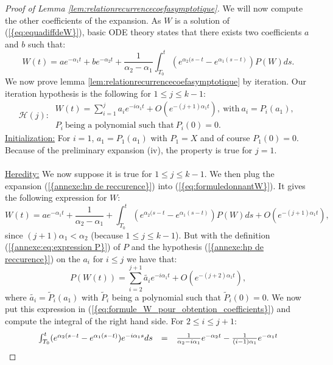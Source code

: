 \documentclass[11pt,a4paper,reqno]{amsart}
\theoremstyle{remark}
\numberwithin{equation}{section}
\begin{document}
\begin{appendix}
\begin{proof}[Proof of Lemma \ref{lem:relationrecurrencecoefasymptotique}]
We will now compute the other coefficients of the expansion. As $W$ is a solution of {{\rm (\ref{{eq:equadiffdeW}})}}, basic ODE theory states that there exists two coefficients $a$ and $b$ such that:
\begin{equation}\label{eq:formuledonnantW}
W(t)=ae^{-\alpha_1 t}+be^{-\alpha_2 t} +\frac{1}{\alpha_2-\alpha_1}\int_{T_0}^t(e^{\alpha_2(s-t}-e^{\alpha_1(s-t)})P(W)ds .
\end{equation}
We now prove lemma \ref{lem:relationrecurrencecoefasymptotique} by iteration. Our iteration hypothesis is the following for $1\leq j\leq k-1$:
\begin{equation} \label{annexe:hp de reccurence}
\mathcal{H}(j): \ \begin{array}{ll} W(t)=\sum_{i=1}^{j} a_ie^{-i\alpha_1 t}+O(e^{-(j+1)\alpha_1 t}), \ \text{with} \ a_i=P_i(a_1), \\
P_i \ \text{being a polynomial such that} \  P_i(0)=0.\end{array}
\end{equation}
\underline{Initialization:} For $i=1$, $a_1=P_1(a_1)$ with $P_1=X$ and of course $P_1(0)=0$. Because of the preliminary expansion (iv), the property is true for $j=1$.\\
\\
\underline{Heredity:} We now suppose it is true for $1\leq j \leq k-1$. We then plug the expansion {{\rm (\ref{{annexe:hp de reccurence}})}} into {{\rm (\ref{{eq:formuledonnantW}})}}. It gives the following expression for $W$:
\begin{equation}\label{eq:formule_W_pour_obtention_coefficients}
W(t)=ae^{-\alpha_1 t}+\frac{1}{\alpha_2-\alpha_1}+\int_{T_0}^t(e^{\alpha_2(s-t}-e^{\alpha_1(s-t)})P(W)ds+O(e^{-(j+1)\alpha_1 t}) ,
\end{equation}
since $(j+1)\alpha_1<\alpha_2$ (because $1\leq j\leq k-1$). But with the definition {{\rm (\ref{{annexe:eq:expression P}})}} of $P$ and the hypothesis {{\rm (\ref{{annexe:hp de reccurence}})}} on the $a_i$ for $i\leq j$ we have that:
$$
P(W(t))=\sum_{i=2}^{j+1}\tilde{a_i}e^{-i\alpha_1 t}+O(e^{-(j+2)\alpha_1 t}) ,
$$
where $\tilde{a_i}=\tilde{P}_i(a_1)$ with $\tilde{P}_i$ being a polynomial such that $\tilde{P}_i(0)=0$. We now put this expression in {{\rm (\ref{{eq:formule_W_pour_obtention_coefficients}})}} and compute the integral of the right hand side. For $2\leq i \leq j+1$:
$$
\begin{array}{r c l}
\int_{T_0}^t(e^{\alpha_2(s-t}-e^{\alpha_1(s-t)})e^{-i\alpha_1 s}ds
&=& \frac{1}{\alpha_2-i\alpha_1}e^{-\alpha_2 t}-\frac{1}{(i-1)\alpha_1}e^{-\alpha_1 t} \\

\end{array}$$
\end{proof}
\end{appendix}
\end{document}
